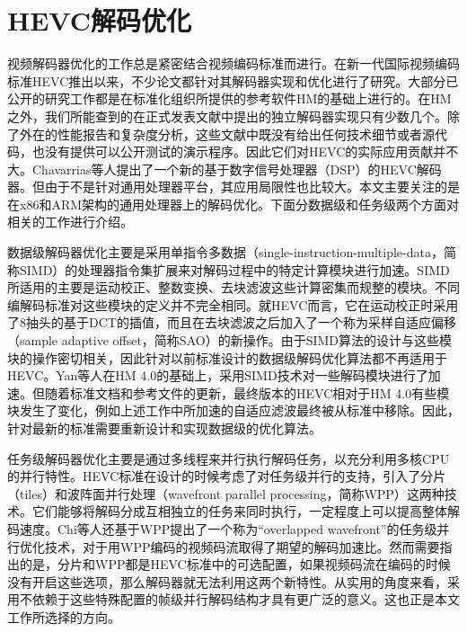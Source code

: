 \section{HEVC解码优化}

视频解码器优化的工作总是紧密结合视频编码标准而进行。在新一代国际视频编码标准HEVC推出以来，不少论文都针对其解码器实现和优化进行了研究。大部分已公开的研究工作都是在标准化组织所提供的参考软件HM\supercite{HM}的基础上进行的。在HM之外，我们所能查到的在正式发表文献中提出的独立解码器实现只有少数几个\supercite{Bossen-TCSVT2012,JCTVC-G988,JCTVC-H0693}。除了外在的性能报告和复杂度分析，这些文献中既没有给出任何技术细节或者源代码，也没有提供可以公开测试的演示程序。因此它们对HEVC的实际应用贡献并不大。Chavarrias等人\supercite{Chavarrias-TCE2013}提出了一个新的基于数字信号处理器（DSP）的HEVC解码器。但由于不是针对通用处理器平台，其应用局限性也比较大。本文主要关注的是在x86和ARM架构的通用处理器上的解码优化。下面分数据级和任务级两个方面对相关的工作进行介绍。

数据级解码器优化主要是采用单指令多数据（single-instruction-multiple-data，简称SIMD）的处理器指令集扩展来对解码过程中的特定计算模块进行加速。SIMD所适用的主要是运动校正、整数变换、去块滤波这些计算密集而规整的模块。不同编解码标准对这些模块的定义并不完全相同。就HEVC而言，它在运动校正时采用了8抽头的基于DCT的插值\supercite{JCTVC-F537}，而且在去块滤波之后加入了一个称为采样自适应偏移（sample adaptive offset，简称SAO）的新操作\supercite{Fu-TCSVT2012}。由于SIMD算法的设计与这些模块的操作密切相关，因此针对以前标准设计的数据级解码优化算法\supercite{Casalino-ICMCS1999,Lappalainen-TCSVT2003,Malvar-TCSVT2003,Chen-JVCIR2006,Pescador-TCE2009}都不再适用于HEVC。Yan等人\supercite{Yan-VCIP2012}在HM 4.0的基础上，采用SIMD技术对一些解码模块进行了加速。但随着标准文档和参考文件的更新，最终版本的HEVC相对于HM 4.0有些模块发生了变化，例如上述工作中所加速的自适应滤波\supercite{JCTVC-F303}最终被从标准中移除。因此，针对最新的标准需要重新设计和实现数据级的优化算法。

任务级解码器优化主要是通过多线程来并行执行解码任务，以充分利用多核CPU的并行特性。HEVC标准在设计的时候考虑了对任务级并行的支持，引入了分片（tiles）\supercite{JCTVC-E408}和波阵面并行处理（wavefront parallel processing，简称WPP）\supercite{JCTVC-E196}这两种技术。它们能够将解码分成互相独立的任务来同时执行，一定程度上可以提高整体解码速度。Chi等人\supercite{Chi-TCSVT2012}还基于WPP提出了一个称为“overlapped wavefront”的任务级并行优化技术，对于用WPP编码的视频码流取得了期望的解码加速比。然而需要指出的是，分片和WPP都是HEVC标准中的可选配置，如果视频码流在编码的时候没有开启这些选项，那么解码器就无法利用这两个新特性。从实用的角度来看，采用不依赖于这些特殊配置的帧级并行解码结构才具有更广泛的意义。这也正是本文工作所选择的方向。

